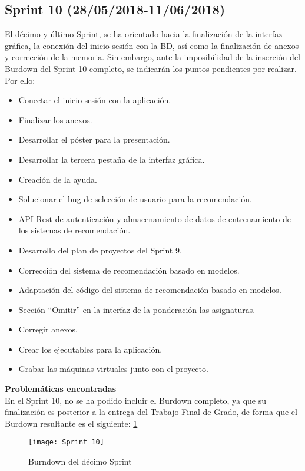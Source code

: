 \subsection{\textbf{Sprint 10} (28/05/2018-11/06/2018) }
El décimo y último Sprint, se ha orientado hacia la finalización de la interfaz gráfica, la conexión del inicio sesión con la BD, así como la finalización de anexos y corrección de la memoria. Sin embargo, ante la imposibilidad de la inserción del Burdown del Sprint 10 completo, se indicarán los puntos pendientes por realizar. 
Por ello: 
\begin{itemize}
\item Conectar el inicio sesión con la aplicación. 
\item Finalizar los anexos. 
\item Desarrollar el póster para la presentación. 
\item Desarrollar la tercera pestaña de la interfaz gráfica. 
\item Creación de la ayuda.
\item Solucionar el bug de selección de usuario para la recomendación. 
\item API Rest de autenticación y almacenamiento de datos de entrenamiento de los sistemas de recomendación. 
\item Desarrollo del plan de proyectos del Sprint 9.
\item Corrección del sistema de recomendación basado en modelos.
\item Adaptación del código del sistema de recomendación basado en modelos. 
\item Sección ``Omitir'' en la interfaz de la ponderación las asignaturas.
\item Corregir anexos. 
\item Crear los ejecutables para la aplicación. 
\item Grabar las máquinas virtuales junto con el proyecto. 

\end{itemize}
\textbf{Problemáticas encontradas}\\En el Sprint 10, no se ha podido incluir el Burdown completo, ya que su finalización es posterior a la entrega del Trabajo Final de Grado, de forma que el Burdown resultante es el siguiente: \ref{fig:A.2.10}
\begin{figure}[h]
\centering
\texttt{[image: Sprint\_10]}
\caption{Burndown del décimo Sprint}
\label{fig:A.2.10}
\end{figure}
\\

